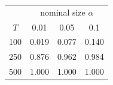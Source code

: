 % 
\begin{tabular}{cccc}
  \hline
  & \multicolumn{3}{c}{nominal size $\alpha$} \\
 $T$ & 0.01 & 0.05 & 0.1 \\
 \hline
100 & 0.019 & 0.077 & 0.140 \\ 
  250 & 0.876 & 0.962 & 0.984 \\ 
  500 & 1.000 & 1.000 & 1.000 \\ 
   \hline
\end{tabular}
